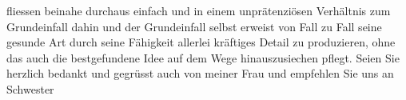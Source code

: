 \begin{ledgroupsized}[t]{13cm}
               fliessen beinahe durchaus einfach und in einem unprätenziösen Verhältnis zum
               Grundeinfall dahin und der Grundeinfall selbst erweist von Fall zu Fall seine gesunde
               Art durch seine Fähigkeit allerlei kräftiges Detail zu produzieren, ohne das auch die
               bestgefundene Idee auf dem Wege hinauszusiechen pflegt.\pend
           \pstart
           Seien Sie herzlich bedankt und gegrüsst auch von meiner Frau und empfehlen Sie uns an Schwester\pend
           
         
         \endnumbering{}\end{ledgroupsized}  \newcommand{\dateiname}{L01940}\newcommand{\titel}{Arthur Schnitzler an Max Mell, 28. 6. 1910}\newcommand{\editorInnen}{Martin Anton Müller und Gerd-Hermann Susen}
      